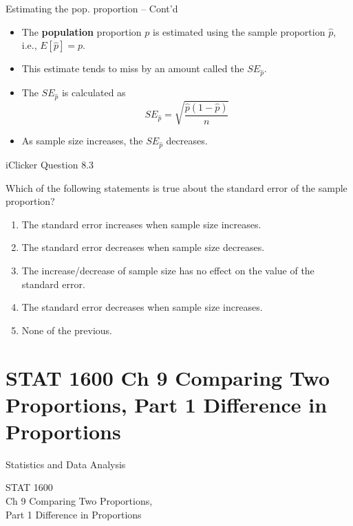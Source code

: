 \documentclass[14pt]{beamer}\usepackage[]{graphicx}\usepackage[]{color}
\begin{document}
\begin{frame}[fragile]{Estimating the pop. proportion -- Cont'd}

\begin{itemize}
\item<1-> The \textbf{population} proportion $p$ is estimated using the sample proportion $\hat{p}$,  i.e., $E[ \hat{p}] = p$.   

\item<2-> This estimate tends to miss by an amount called the $SE_{\hat{p}}$.

\item<3-> The $SE_{\hat{p}}$ is calculated as 
\begin{equation*}
SE_{\hat{p}} = \sqrt{ \frac{ \hat{p} ( 1 - \hat{p})}{n}}
\end{equation*}

\item<4-> As sample size increases, the $SE_{\hat{p}}$ decreases.
\end{itemize}
\end{frame}

\begin{frame}[fragile]{iClicker Question 8.3}

Which of the following statements is true about the standard error of  the sample proportion?

\begin{enumerate}
\item The standard error increases when sample size  increases.
\item The standard error decreases when sample size  decreases.
\item The increase/decrease of sample size has no effect on  the value of the standard error.
\item The standard error decreases when sample size  increases.
\item None of the previous.
\end{enumerate}
\end{frame}



\section{STAT 1600 Ch 9 Comparing Two Proportions,  Part 1 Difference in Proportions}

\begin{frame}[fragile]{Statistics and Data Analysis}

STAT 1600 \\ Ch 9 Comparing Two Proportions, \\ Part 1 Difference in Proportions

\end{frame}
\end{document}
